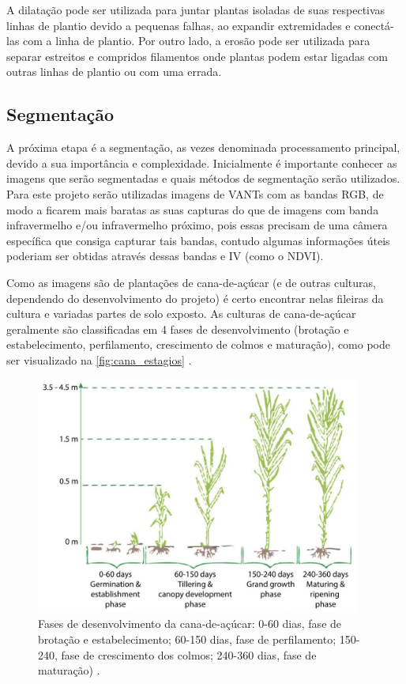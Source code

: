 \documentclass[12pt, a4paper, english, brazil]{article}
\begin{document}
A dilatação pode ser utilizada para juntar plantas isoladas de suas respectivas linhas de plantio devido a pequenas falhas, ao expandir extremidades e conectá-las com a linha de plantio. Por outro lado, a erosão pode ser utilizada para separar estreitos e compridos filamentos onde plantas podem estar ligadas com outras linhas de plantio ou com uma errada.

\subsection{Segmentação}

A próxima etapa é a segmentação, as vezes denominada processamento principal, devido a sua importância e complexidade. Inicialmente é importante conhecer as imagens que serão segmentadas e quais métodos de segmentação serão utilizados. Para este projeto serão utilizadas imagens de VANTs com as bandas RGB, de modo a ficarem mais baratas as suas capturas do que de imagens com banda infravermelho e/ou infravermelho próximo, pois essas precisam de uma câmera específica que consiga capturar tais bandas, contudo algumas informações úteis poderiam ser obtidas através dessas bandas e IV (como o NDVI).

Como as imagens são de plantações de cana-de-açúcar (e de outras culturas, dependendo do desenvolvimento do projeto) é certo encontrar nelas fileiras da cultura e variadas partes de solo exposto. As culturas de cana-de-açúcar geralmente são classificadas em 4 fases de desenvolvimento (brotação e estabelecimento, perfilamento, crescimento de colmos e maturação), como pode ser visualizado na \autoref{fig:cana_estagios} \cite{Lu_Zhou_2019}.

\begin{figure}[htb] %
    \centering
    \includegraphics[width=0.95\textwidth]{img/cana_estagios.jpg}
    \caption{Fases de desenvolvimento da cana-de-açúcar: 0-60 dias, fase de brotação e estabelecimento; 60-150 dias, fase de perfilamento; 150-240, fase de crescimento dos colmos; 240-360 dias, fase de maturação) \cite{Molijn_2019}.}
    \label{fig:cana_estagios}
\end{figure}
\end{document}

